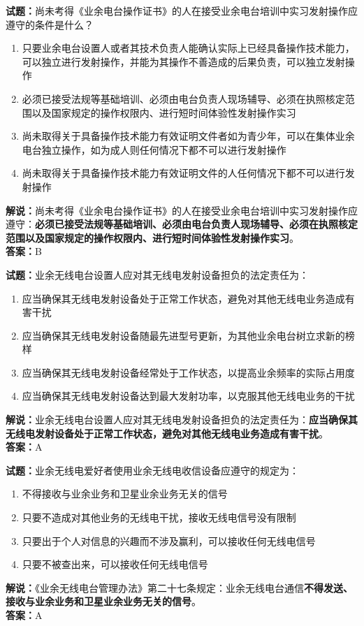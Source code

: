 \documentclass{ctexbook}
\begin{document}
\bigskip

\noindent\textbf{试题：}尚未考得《业余电台操作证书》的人在接受业余电台培训中实习发射操作应遵守的条件是什么？
\begin{enumerate}[leftmargin=3em]
  \item 只要业余电台设置人或者其技术负责人能确认实际上已经具备操作技术能力，可以独立进行发射操作，并能为其操作不善造成的后果负责，可以独立发射操作
  \item 必须已接受法规等基础培训、必须由电台负责人现场辅导、必须在执照核定范围以及国家规定的操作权限内、进行短时间体验性发射操作实习
  \item 尚未取得关于具备操作技术能力有效证明文件者如为青少年，可以在集体业余电台独立操作，如为成人则任何情况下都不可以进行发射操作
  \item 尚未取得关于具备操作技术能力有效证明文件的人任何情况下都不可以进行发射操作
\end{enumerate}
\noindent\textbf{解说：}尚未考得《业余电台操作证书》的人在接受业余电台培训中实习发射操作应遵守：\textbf{必须已接受法规等基础培训、必须由电台负责人现场辅导、必须在执照核定范围以及国家规定的操作权限内、进行短时间体验性发射操作实习}。\\\noindent\textbf{答案：}B

\bigskip

\noindent\textbf{试题：}业余无线电台设置人应对其无线电发射设备担负的法定责任为：
\begin{enumerate}[leftmargin=3em]
  \item 应当确保其无线电发射设备处于正常工作状态，避免对其他无线电业务造成有害干扰
  \item 应当确保其无线电发射设备随最先进型号更新，为其他业余电台树立求新的榜样
  \item 应当确保其无线电发射设备经常处于工作状态，以提高业余频率的实际占用度
  \item 应当确保其无线电发射设备达到最大发射功率，以克服其他无线电业务的干扰
\end{enumerate}
\noindent\textbf{解说：}业余无线电台设置人应对其无线电发射设备担负的法定责任为：\textbf{应当确保其无线电发射设备处于正常工作状态，避免对其他无线电业务造成有害干扰}。\\\noindent\textbf{答案：}A


\bigskip

\noindent\textbf{试题：}业余无线电爱好者使用业余无线电收信设备应遵守的规定为：
\begin{enumerate}[leftmargin=3em]
  \item 不得接收与业余业务和卫星业余业务无关的信号
  \item 只要不造成对其他业务的无线电干扰，接收无线电信号没有限制
  \item 只要出于个人对信息的兴趣而不涉及赢利，可以接收任何无线电信号
  \item 只要不被查出来，可以接收任何无线电信号
\end{enumerate}
\noindent\textbf{解说：}《业余无线电台管理办法》第二十七条规定：业余无线电台通信\textbf{不得发送、接收与业余业务和卫星业余业务无关的信号}。\\\noindent\textbf{答案：}A
\end{document}

